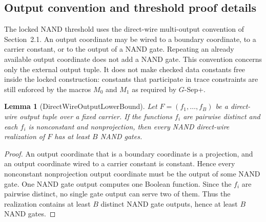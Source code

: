 \documentclass[10.5pt,a4paper]{article}
\newtheorem{lemma}[theorem]{Lemma}
\begin{document}
\subsection{Output convention and threshold proof details}
The locked NAND threshold uses the direct-wire multi-output convention of Section~2.1.  An output coordinate
may be wired to a boundary coordinate, to a carrier constant, or to the output of a NAND gate.  Repeating an
already available output coordinate does not add a NAND gate.  This convention concerns only the external
output tuple.  It does not make checked data constants free inside the locked construction: constants that
participate in trace constraints are still enforced by the macros \(M_0\) and \(M_1\) as required by \(G\)-Sep+.

\begin{lemma}[DirectWireOutputLowerBound]
Let \(F=(f_1,\ldots,f_B)\) be a direct-wire output tuple over a fixed carrier.  If the functions \(f_i\) are
pairwise distinct and each \(f_i\) is nonconstant and nonprojection, then every NAND direct-wire realization of
\(F\) has at least \(B\) NAND gates.
\end{lemma}
\begin{proof}
An output coordinate that is a boundary coordinate is a projection, and an output coordinate wired to a carrier
constant is constant.  Hence every nonconstant nonprojection output coordinate must be the output of some
NAND gate.  One NAND gate output computes one Boolean function.  Since the \(f_i\) are pairwise distinct,
no single gate output can serve two of them.  Thus the realization contains at least \(B\) distinct NAND gate
outputs, hence at least \(B\) NAND gates.
\end{proof}
\end{document}
